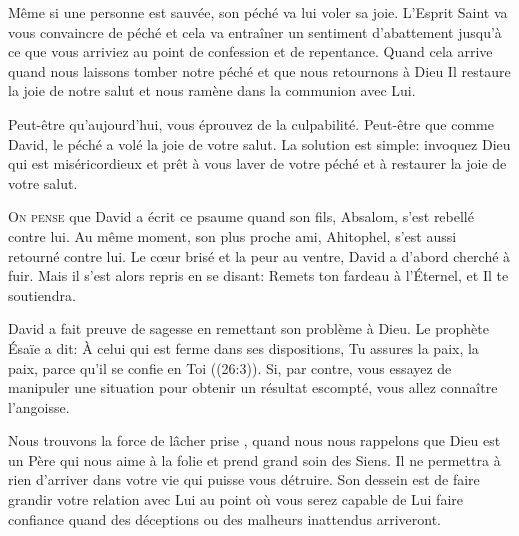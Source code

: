 Même si une personne est sauvée, son péché va lui voler sa joie.
 L'Esprit Saint 
 va vous convaincre de péché et cela va entraîner
 un sentiment d'abattement jusqu'à ce que vous arriviez au point de confession
 et de repentance.
 Quand cela arrive \ocadr quand nous laissons tomber notre péché
 et que nous retournons à Dieu \fcadr Il restaure la joie de notre salut
 et nous ramène dans la communion avec Lui. 

Peut-être qu'aujourd'hui, vous éprouvez de la culpabilité.
 Peut-être que comme David, le péché a volé la joie de votre salut.
 La solution est simple: invoquez Dieu qui est miséricordieux
 et prêt à vous laver de votre péché et à restaurer la joie de votre salut.

\dvrule






\lettrine{O}{n pense} que David a écrit ce psaume quand son fils,
 Absalom, s'est rebellé contre lui.
 Au même moment, son plus proche ami, Ahitophel,
 s'est aussi retourné contre lui. Le c\oe{}ur brisé et la peur au ventre,
 David a d'abord cherché à fuir.
 Mais il s'est alors repris en se disant:
 \Og Remets ton fardeau à l'Éternel, et Il te soutiendra. \Fg{}


David a fait preuve de sagesse en remettant son problème à Dieu.
 Le prophète Ésaïe a dit:
 \Og \`A celui qui est ferme dans ses dispositions, Tu assures la paix,
 la paix, parce qu'il se confie en Toi \Fg{} ((26:3)).
 Si, par contre, vous essayez de manipuler une situation pour obtenir
 un résultat escompté, vous allez connaître l'angoisse. 

Nous trouvons la force de \Og lâcher prise \Fg{},
 quand nous nous rappelons que Dieu est un Père qui nous aime
 à la folie et prend grand soin des Siens.
 Il ne permettra à rien d'arriver dans votre vie qui puisse vous détruire.
 Son dessein est de faire grandir votre relation avec Lui au point
 où vous serez capable de Lui faire confiance quand des déceptions
 ou des malheurs inattendus arriveront. 


